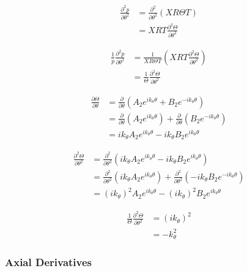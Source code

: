 \documentclass[a4paper]{report}
\begin{document}
\begin{align*}
    \frac{\partial^2 p}{\partial \theta^2} 
    &=
    \frac{\partial^2 }{\partial \theta^2}  \left( XR\Theta T \right) \\
    &=
    XRT\frac{\partial^2 \Theta }{\partial \theta^2}  
\end{align*}


\begin{align*}
    \frac{1}{p}\frac{\partial^2 p}{\partial \theta^2} 
    &=
    \frac{ 1}{X R \Theta T}  \left( XRT\frac{\partial^2 \Theta}{\partial \theta^2} \right) \\
    &=\frac{ 1}{ \Theta}\frac{\partial^2 \Theta}{\partial \theta^2}  
\end{align*}

\begin{align*}
    \frac{\partial \Theta}{\partial \theta} &=
    \frac{\partial}{\partial \theta}
        \left( 
            A_2 e^{i k_{\theta} \theta} + B_2 e^{-i k_{\theta} \theta}
        \right)  \\
    &=
    \frac{\partial}{\partial \theta} \left(A_2 e^{i k_{\theta} \theta}  \right) +
    \frac{\partial}{\partial \theta} \left(B_2 e^{-i k_{\theta} \theta}  \right)\\ 
    &= i k_{\theta} A_2 e^{i k_{\theta} \theta} - i k_{\theta} B_2 e^{i k_{\theta} \theta} 
\end{align*}

\begin{align*}
    \frac{\partial^2 \Theta }{\partial \theta^2} &=
    \frac{\partial^2}{\partial \theta^2}
        \left( 
        i k_{\theta} A_2 e^{i k_{\theta} \theta} - i k_{\theta} B_2 e^{i k_{\theta} \theta} 
    \right)  \\
    &=
    \frac{\partial^2}{\partial \theta^2} \left(i k_{\theta} A_2 e^{i k_{\theta} \theta}  \right) +
    \frac{\partial^2}{\partial \theta^2} \left(- i k_{\theta} B_2 e^{-i k_{\theta} \theta}  \right)\\ 
    &= (i k_{\theta})^2 A_2 e^{i k_{\theta} \theta } - (i k_{\theta})^2 B_2 e^{i k_{\theta} \theta} 
\end{align*}

\begin{align*}
    \frac{1}{\Theta}\frac{\partial^2 \Theta}{\partial \theta^2} 
    &=
    (ik_{\theta})^2 \\
    &= -k_{\theta}^2
\end{align*}

\subsubsection{Axial Derivatives}
\end{document}
